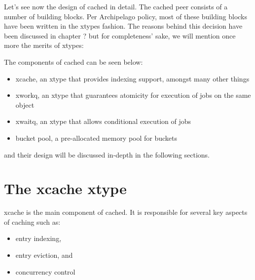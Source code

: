 Let's see now the design of cached in detail. The cached peer consists of a 
number of building blocks.  Per Archipelago policy, most of these building 
blocks have been written in the xtypes fashion. The reasons behind this decision 
have been discussed in chapter ?
but for completeness' sake, we will mention once more the merits of xtypes:



\begin{comment}
More specifically, cached consists of the cache provided by xcache aasfs as safa
asfasfnd a
pre-allocated number of objects. An object is divided in buckets and its size,
as well as bucket size, are defined by the user.

The fact that objects are pre-allocated means two things:

1) We don't need to care about memory fragmentation and system call overhead
2) We cannot index single buckets. <FILLME>
\end{comment}

The components of cached can be seen below:

\begin{itemize}
	\item xcache, an xtype that provides indexing support, amongst many 
		other things
	\item xworkq, an xtype that guarantees atomicity for execution of jobs 
		on the same object
	\item xwaitq, an xtype that allows conditional execution of jobs
	\item bucket pool, a pre-allocated memory pool for buckets
\end{itemize}

and their design will be discussed in-depth in the following sections.

\section{The xcache xtype}\label{sec:xcache-design}

xcache is the main component of cached. It is responsible for several key 
aspects of caching such as:

\begin{itemize}
	\item entry indexing,
	\item entry eviction, and
	\item concurrency control
\end{itemize}

